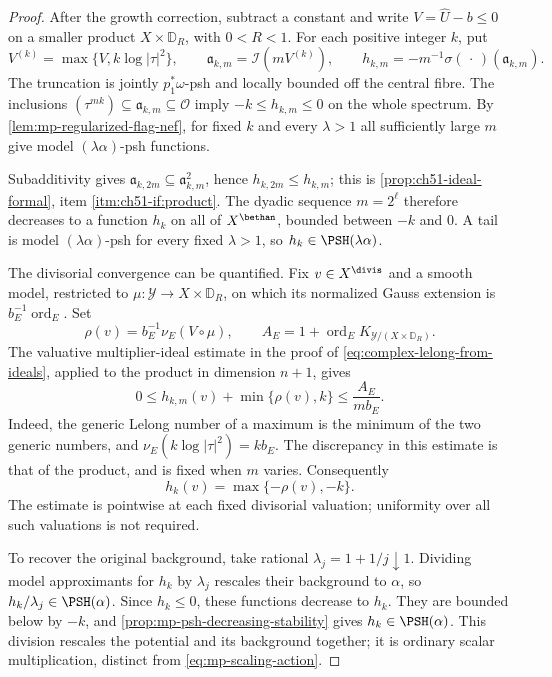 \begin{proof}
After the growth correction, subtract a constant and write $V=\widehat U-b\leq0$ on a smaller product $X\times\mathbb D_R$, with $0<R<1$. For each positive integer $k$, put
\[
 V^{(k)}=\max\{V,k\log|\tau|^2\},\qquad
 \mathfrak a_{k,m}=\mathcal I(mV^{(k)}),\qquad
 h_{k,m}=-m^{-1}\sigma(\,\cdot\,)(\mathfrak a_{k,m}).
\]
The truncation is jointly $p_1^*\omega$-psh and locally bounded off the central fibre. The inclusions $(\tau^{mk})\subseteq\mathfrak a_{k,m}\subseteq\mathcal O$ imply $-k\leq h_{k,m}\leq0$ on the whole spectrum. By \cref{lem:mp-regularized-flag-nef}, for fixed $k$ and every $\lambda>1$ all sufficiently large $m$ give model $(\lambda\alpha)$-psh functions.

Subadditivity gives $\mathfrak a_{k,2m}\subseteq\mathfrak a_{k,m}^2$, hence $h_{k,2m}\leq h_{k,m}$; this is \cref{prop:ch51-ideal-formal}, item \cref{itm:ch51-if:product}. The dyadic sequence $m=2^\ell$ therefore decreases to a function $h_k$ on all of $X^{\bethan}$, bounded between $-k$ and $0$. A tail is model $(\lambda\alpha)$-psh for every fixed $\lambda>1$, so $h_k\in\PSH(\lambda\alpha)$.

The divisorial convergence can be quantified. Fix $v\in X^{\divis}$ and a smooth model, restricted to $\mu:\mathcal Y\to X\times\mathbb D_R$, on which its normalized Gauss extension is $b_E^{-1}\operatorname{ord}_E$. Set
\[
 \rho(v)=b_E^{-1}\nu_E(V\circ\mu),\qquad
 A_E=1+\operatorname{ord}_E K_{\mathcal Y/(X\times\mathbb D_R)}.
\]
The valuative multiplier-ideal estimate in the proof of \eqref{eq:complex-lelong-from-ideals}, applied to the product in dimension $n+1$, gives
\[
 0\leq h_{k,m}(v)+\min\{\rho(v),k\}
                    \leq\frac{A_E}{mb_E}.
\tag{60.23d}\label{eq:mp-truncated-divisorial-error}
\]
Indeed, the generic Lelong number of a maximum is the minimum of the two generic numbers, and $\nu_E(k\log|\tau|^2)=kb_E$. The discrepancy in this estimate is that of the product, and is fixed when $m$ varies. Consequently
\[
                       h_k(v)=\max\{-\rho(v),-k\}.
\tag{60.23e}\label{eq:mp-truncated-divisorial-limit}
\]
The estimate is pointwise at each fixed divisorial valuation; uniformity over all such valuations is not required.

To recover the original background, take rational $\lambda_j=1+1/j\downarrow1$. Dividing model approximants for $h_k$ by $\lambda_j$ rescales their background to $\alpha$, so $h_k/\lambda_j\in\PSH(\alpha)$. Since $h_k\leq0$, these functions decrease to $h_k$. They are bounded below by $-k$, and \cref{prop:mp-psh-decreasing-stability} gives $h_k\in\PSH(\alpha)$. This division rescales the potential and its background together; it is ordinary scalar multiplication, distinct from \eqref{eq:mp-scaling-action}.


\end{proof}
